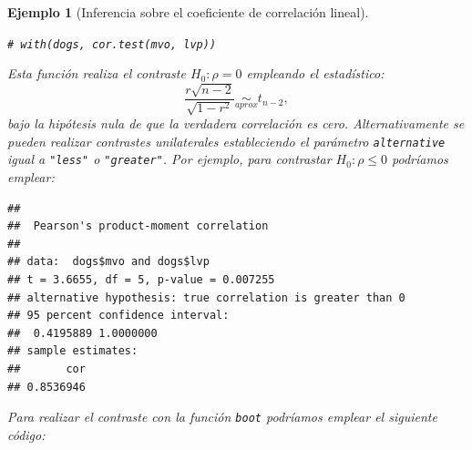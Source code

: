 \documentclass[
]{book}
\newenvironment{Shaded}{\begin{snugshade}}{\end{snugshade}}
\newcommand{\AttributeTok}[1]{\textcolor[rgb]{0.77,0.63,0.00}{#1}}
\newcommand{\CommentTok}[1]{\textcolor[rgb]{0.56,0.35,0.01}{\textit{#1}}}
\newcommand{\ControlFlowTok}[1]{\textcolor[rgb]{0.13,0.29,0.53}{\textbf{#1}}}
\newcommand{\DecValTok}[1]{\textcolor[rgb]{0.00,0.00,0.81}{#1}}
\newcommand{\FunctionTok}[1]{\textcolor[rgb]{0.00,0.00,0.00}{#1}}
\newcommand{\NormalTok}[1]{#1}
\newcommand{\OtherTok}[1]{\textcolor[rgb]{0.56,0.35,0.01}{#1}}
\newcommand{\SpecialCharTok}[1]{\textcolor[rgb]{0.00,0.00,0.00}{#1}}
\newcommand{\StringTok}[1]{\textcolor[rgb]{0.31,0.60,0.02}{#1}}
\theoremstyle{break}
\newtheorem{example}{Ejemplo}[chapter]
\theoremstyle{nonumberplain}
\renewcommand{\CommentTok}[1]{\textcolor[rgb]{0.41,0.41,0.41}{\texttt{#1}}}
\begin{document}
\begin{example}[Inferencia sobre el coeficiente de correlación lineal]
\begin{Shaded}
\begin{Highlighting}[]
\CommentTok{\# with(dogs, cor.test(mvo, lvp))}
\end{Highlighting}
\end{Shaded}

Esta función realiza el contraste \(H_0: \rho = 0\) empleando el estadístico:
\[\frac{r\sqrt{n - 2}}{\sqrt{1 - r^2}} \underset{aprox}{\sim } t_{n-2},\]
bajo la hipótesis nula de que la verdadera correlación es cero.
Alternativamente se pueden realizar contrastes unilaterales estableciendo
el parámetro \texttt{alternative} igual a \texttt{"less"} o \texttt{"greater"}.
Por ejemplo, para contrastar \(H_0: \rho \leq 0\) podríamos emplear:

\begin{Shaded}
\end{Shaded}

\begin{verbatim}
## 
##  Pearson's product-moment correlation
## 
## data:  dogs$mvo and dogs$lvp
## t = 3.6655, df = 5, p-value = 0.007255
## alternative hypothesis: true correlation is greater than 0
## 95 percent confidence interval:
##  0.4195889 1.0000000
## sample estimates:
##       cor 
## 0.8536946
\end{verbatim}

Para realizar el contraste con la función \texttt{boot} podríamos
emplear el siguiente código:

\begin{Shaded}
\end{Shaded}


\end{example}
\end{document}
